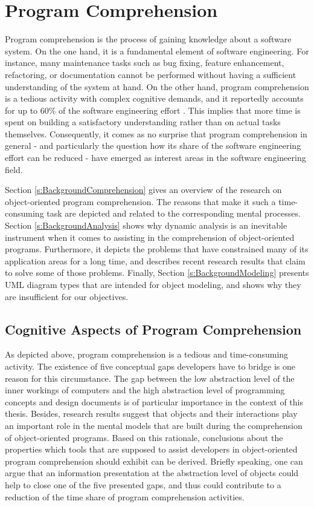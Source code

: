 \chapter{Program Comprehension}
\label{c:Background}
Program comprehension is the process of gaining knowledge about a software system.
On the one hand, it is a fundamental element of software engineering.
For instance, many maintenance tasks such as bug fixing, feature enhancement, refactoring, or documentation cannot be performed without having a sufficient understanding of the system at hand. On the other hand, program comprehension is a tedious activity with complex cognitive demands, and it reportedly accounts for up to 60\% of the software engineering effort \cite{corbi_program_1989, basili_evolving_1997}.
This implies that more time is spent on building a satisfactory understanding rather than on actual tasks themselves.
Consequently, it comes as no surprise that program comprehension in general - and particularly the question how its share of the software engineering effort can be reduced - have emerged as interest areas in the software engineering field.

Section \ref{s:BackgroundComprehension} gives an overview of the research on object-oriented program comprehension.
The reasons that make it such a time-consuming task are depicted and related to the corresponding mental processes.
Section \ref{s:BackgroundAnalysis} shows why dynamic analysis is an inevitable instrument when it comes to assisting in the comprehension of object-oriented programs.
Furthermore, it depicts the problems that have constrained many of its application areas for a long time, and describes recent research results that claim to solve some of those problems.
Finally, Section \ref{s:BackgroundModeling} presents UML diagram types that are intended for object modeling, and shows why they are insufficient for our objectives. 

\section[Cognitive Aspects of Program Comprehension]{Cognitive Aspects of Program Comprehension%
}
\label{s:BackgroundComprehension}
As depicted above, program comprehension is a tedious and time-consuming activity.
The existence of five conceptual gaps developers have to bridge is one reason for this circumstance.
The gap between the low abstraction level of the inner workings of computers and the high abstraction level of programming concepts and design documents is of particular importance in the context of this thesis.
Besides, research results suggest that objects and their interactions play an important role in the mental models that are built during the comprehension of object-oriented programs.
Based on this rationale, conclusions about the properties which tools that are supposed to assist developers in object-oriented program comprehension should exhibit can be derived.
Briefly speaking, one can argue that an information presentation at the abstraction level of objects could help to close one of the five presented gaps, and thus could contribute to a reduction of the time share of program comprehension activities.

